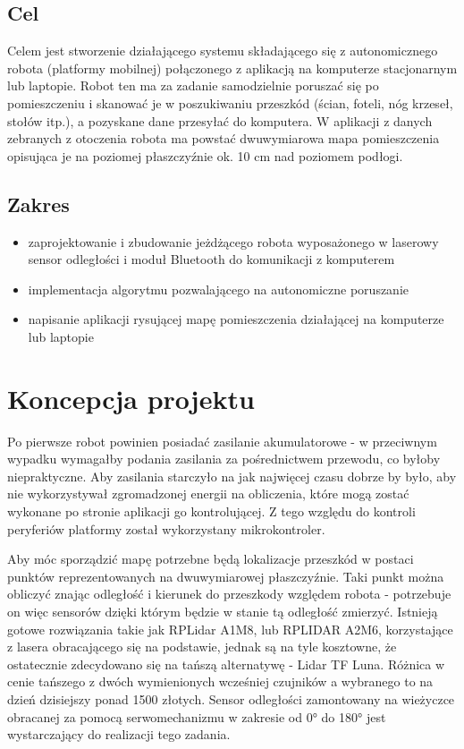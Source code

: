 \subsection{Cel}
Celem jest stworzenie działającego systemu składającego się z autonomicznego robota (platformy mobilnej) połączonego z aplikacją na komputerze stacjonarnym lub laptopie. Robot ten ma za zadanie samodzielnie poruszać się po pomieszczeniu i skanować je w poszukiwaniu przeszkód (ścian, foteli, nóg krzeseł, stołów itp.), a pozyskane dane przesyłać do komputera. W
aplikacji z danych zebranych z otoczenia robota ma powstać dwuwymiarowa mapa pomieszczenia opisująca je na poziomej płaszczyźnie ok. 10 cm nad poziomem podłogi.

\subsection{Zakres}
\begin{itemize}
    \item zaprojektowanie i zbudowanie jeżdżącego robota wyposażonego w laserowy sensor odległości i moduł Bluetooth do komunikacji z komputerem
    \item implementacja algorytmu pozwalającego na autonomiczne poruszanie
    \item napisanie aplikacji rysującej mapę pomieszczenia działającej na komputerze lub laptopie
\end{itemize}


\section{Koncepcja projektu}
Po pierwsze robot powinien posiadać zasilanie akumulatorowe - w przeciwnym wypadku wymagałby podania zasilania za pośrednictwem przewodu, co byłoby niepraktyczne. Aby zasilania starczyło na jak najwięcej czasu dobrze by było, aby nie wykorzystywał zgromadzonej energii na obliczenia, które mogą zostać wykonane po stronie aplikacji go kontrolującej. Z tego względu do kontroli peryferiów platformy został wykorzystany mikrokontroler.

Aby móc sporządzić mapę potrzebne będą lokalizacje przeszkód w postaci punktów reprezentowanych na dwuwymiarowej płaszczyźnie. Taki punkt można obliczyć znając odległość i kierunek do przeszkody względem robota - potrzebuje on więc  sensorów dzięki którym będzie w stanie tą odległość zmierzyć. Istnieją gotowe rozwiązania takie jak RPLidar A1M8, lub RPLIDAR A2M6, korzystające z lasera obracającego się na podstawie, jednak są na tyle kosztowne, że ostatecznie zdecydowano się na tańszą alternatywę - Lidar TF Luna. Różnica w cenie tańszego z dwóch wymienionych wcześniej czujników a wybranego to na dzień dzisiejszy ponad 1500 złotych. Sensor odległości zamontowany na wieżyczce obracanej za pomocą serwomechanizmu  w zakresie od 0° do 180° jest wystarczający do realizacji tego zadania.

